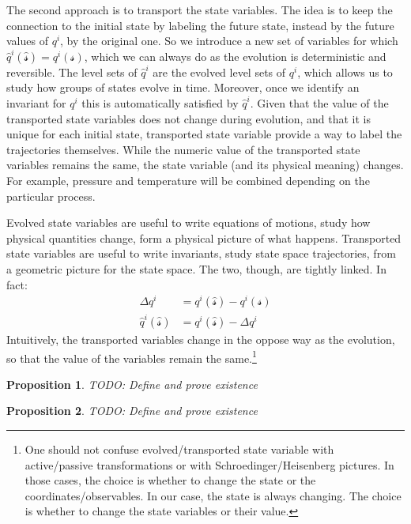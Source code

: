\documentclass[aps,pra,10pt,twocolumn,floatfix,nofootinbib]{revtex4-1}
\newtheorem{prop}{Proposition}[section]
\theoremstyle{definition}
\begin{document}
The second approach is to transport the state variables. The idea is to keep the connection to the initial state by labeling the future state, instead by the future values of $q^i$, by the original one. So we introduce a new set of variables for which $\hat{q}^i(\hat{\mathcal{s}})=q^i(\mathcal{s})$, which we can always do as the evolution is deterministic and reversible. The level sets of $\hat{q}^i$ are the evolved level sets of $q^i$, which allows us to study how groups of states evolve in time. Moreover, once we identify an invariant for $q^i$ this is automatically satisfied by $\hat{q}^i$. Given that the value of the transported state variables does not change during evolution, and that it is unique for each initial state, transported state variable provide a way to label the trajectories themselves. While the numeric value of the transported state variables remains the same, the state variable (and its physical meaning) changes. For example, pressure and temperature will be combined depending on the particular process.

Evolved state variables are useful to write equations of motions, study how physical quantities change, form a physical picture of what happens. Transported state variables are useful to write invariants, study state space trajectories, from a geometric picture for the state space. The two, though, are tightly linked. In fact:
\begin{align*}
\Delta q^i &= q^i(\hat{\mathcal{s}}) - q^i(\mathcal{s}) \\
\hat{q}^i(\hat{\mathcal{s}}) &= q^i(\hat{\mathcal{s}}) - \Delta q^i
\end{align*}
Intuitively, the transported variables change in the oppose way as the evolution, so that the value of the variables remain the same.\footnote{One should not confuse evolved/transported state variable with active/passive transformations or with Schroedinger/Heisenberg pictures. In those cases, the choice is whether to change the state or the coordinates/observables. In our case, the state is always changing. The choice is whether to change the state variables or their value.}

\begin{prop}\label{evolved variable}
TODO: Define and prove existence
\end{prop}

\begin{prop}\label{transported variable}
TODO: Define and prove existence
\end{prop}
\end{document}
